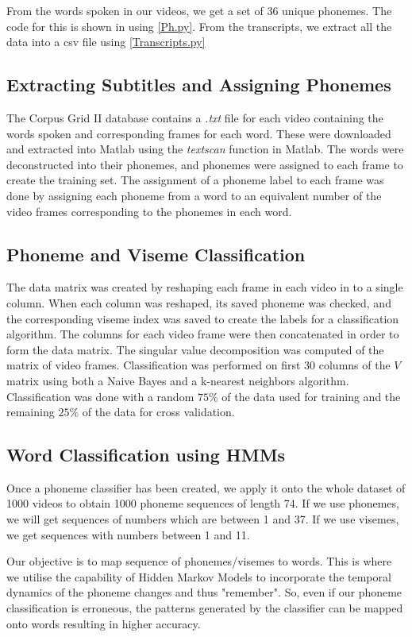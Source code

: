 \documentclass[a4paper]{article}
\begin{document}
From the words spoken in our videos, we get a set of 36 unique phonemes. The code for this is shown in using \ref{Ph.py}. From the transcripts, we extract all the data into a csv file using \ref{Transcripts.py}



\subsection{Extracting Subtitles and Assigning Phonemes}
The Corpus Grid II database contains a {\it .txt} file for each video containing the words spoken and corresponding frames for each word.  These were downloaded and extracted into Matlab using the {\it textscan} function in Matlab.  The words were deconstructed into their phonemes, and phonemes were assigned to each frame to create the training set.  The assignment of a phoneme label to each frame was done by assigning each phoneme from a word to an equivalent number of the video frames corresponding to the phonemes in each word. 

\subsection{Phoneme and Viseme Classification}
The data matrix was created by reshaping each frame in each video in to a single column.  When each column was reshaped, its saved phoneme was checked, and the corresponding viseme index was saved to create the labels for a classification algorithm. The columns for each video frame were then concatenated in order to form the data matrix.  The singular value decomposition was computed of the matrix of video frames.  Classification was performed on first 30 columns of the $V$ matrix using both a Naive Bayes and a k-nearest neighbors algorithm.  Classification was done with a random $75\%$ of the data used for training and the remaining $25\%$ of the data for cross validation.

\subsection{Word Classification using HMMs}

Once a phoneme classifier has been created, we apply it onto the whole dataset of 1000 videos to obtain 1000 phoneme sequences of length 74. If we use phonemes, we will get sequences of numbers which are between 1 and 37. If we use visemes, we get sequences with numbers between 1 and 11.

Our objective is to map sequence of phonemes/visemes to words. This is where we utilise the capability of Hidden Markov Models to incorporate the temporal dynamics of the phoneme changes and thus "remember". So, even if our phoneme classification is erroneous, the patterns generated by the classifier can be mapped onto words resulting in higher accuracy.
\end{document}
